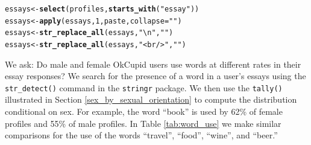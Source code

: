\documentclass{article}\usepackage[]{graphicx}\usepackage[]{color}
\makeatletter
\newcommand{\hlnum}[1]{\textcolor[rgb]{0.686,0.059,0.569}{#1}}%
\newcommand{\hlstr}[1]{\textcolor[rgb]{0.192,0.494,0.8}{#1}}%
\newcommand{\hlstd}[1]{\textcolor[rgb]{0.345,0.345,0.345}{#1}}%
\newcommand{\hlkwb}[1]{\textcolor[rgb]{0.69,0.353,0.396}{#1}}%
\newcommand{\hlkwc}[1]{\textcolor[rgb]{0.333,0.667,0.333}{#1}}%
\newcommand{\hlkwd}[1]{\textcolor[rgb]{0.737,0.353,0.396}{\textbf{#1}}}%
\newenvironment{kframe}{%
 \def\at@end@of@kframe{}%
 \ifinner\ifhmode%
  \def\at@end@of@kframe{\end{minipage}}%
  \begin{minipage}{\columnwidth}%
 \fi\fi%
 \def\FrameCommand##1{\hskip\@totalleftmargin \hskip-\fboxsep
 \colorbox{shadecolor}{##1}\hskip-\fboxsep
     \hskip-\linewidth \hskip-\@totalleftmargin \hskip\columnwidth}%
 \MakeFramed {\advance\hsize-\width
   \@totalleftmargin\z@ \linewidth\hsize
   \@setminipage}}%
 {\par\unskip\endMakeFramed%
 \at@end@of@kframe}
\newenvironment{knitrout}{}{} %
\makeatother
\begin{document}

\begin{knitrout}
\color{fgcolor}\begin{kframe}
\begin{alltt}
\hlstd{essays} \hlkwb{<-} \hlkwd{select}\hlstd{(profiles,} \hlkwd{starts_with}\hlstd{(}\hlstr{"essay"}\hlstd{))}
\hlstd{essays} \hlkwb{<-} \hlkwd{apply}\hlstd{(essays,} \hlnum{1}\hlstd{, paste,} \hlkwc{collapse}\hlstd{=}\hlstr{" "}\hlstd{)}
\hlstd{essays} \hlkwb{<-} \hlkwd{str_replace_all}\hlstd{(essays,} \hlstr{"\textbackslash{}n"}\hlstd{,} \hlstr{" "}\hlstd{)}
\hlstd{essays} \hlkwb{<-} \hlkwd{str_replace_all}\hlstd{(essays,} \hlstr{"<br />"}\hlstd{,} \hlstr{" "}\hlstd{)}
\end{alltt}
\end{kframe}
\end{knitrout}

We ask:  Do male and female OkCupid users use words at different rates in their essay responses?  We search for the presence of a word in a user's essays using the  \verb#str_detect()# command in the \verb#stringr# package.  We then use the \verb#tally()# illustrated in Section \ref{sex_by_sexual_orientation} to compute the distribution conditional on sex.  For example, the word ``book'' is used by 62\% of female profiles and 55\% of male profiles.  In Table \ref{tab:word_use} we make similar comparisons for the use of the words ``travel'', ``food'', ``wine'', and ``beer.''
\end{document}
